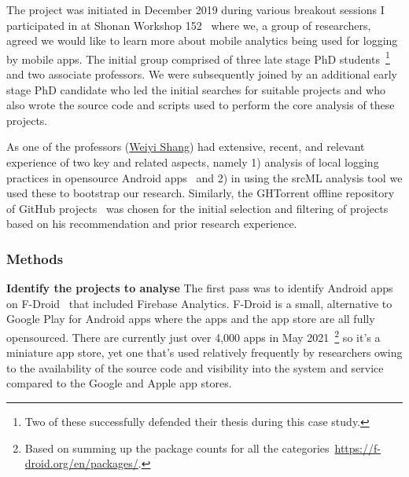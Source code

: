 The project was initiated in December 2019 during various breakout sessions I participated in at Shonan Workshop 152~\citep{nii_shonan_workshop_152} where we, a group of researchers, agreed we would like to learn more about mobile analytics being used for logging by mobile apps. The initial group comprised of three late stage PhD students~\footnote{Two of these successfully defended their thesis during this case study.} and two associate professors. We were subsequently joined by an additional early stage PhD candidate who led the initial searches for suitable projects and who also wrote the source code and scripts used to perform the core analysis of these projects.

As one of the professors (\href{https://users.encs.concordia.ca/~shang/}{Weiyi Shang}) had extensive, recent, and relevant experience of two key and related aspects, namely 1) analysis of local logging practices in opensource Android apps~\citep{zeng2019studying_logging_practices_fdroid} and 2) in using the srcML analysis tool we used these to bootstrap our research. Similarly, the GHTorrent offline repository of GitHub projects~\citep{gousios2012_ghtorrent_githubs_data_from_a_firehose} was chosen for the initial selection and filtering of projects based on his recommendation and prior research experience. 


\subsubsection{Methods} 

\textbf{Identify the projects to analyse}
The first pass was to identify Android apps on F-Droid~\citep{fdroidwebsite} that included Firebase Analytics. F-Droid is a small, alternative to Google Play for Android apps where the apps and the app store are all fully opensourced. There are currently just over 4,000 apps in May 2021~\footnote{Based on summing up the package counts for all the categories~\url{https://f-droid.org/en/packages/}.} %
so it's a miniature app store, yet one that's used relatively frequently by researchers owing to the availability of the source code and visibility into the system and service compared to the Google and Apple app stores.


